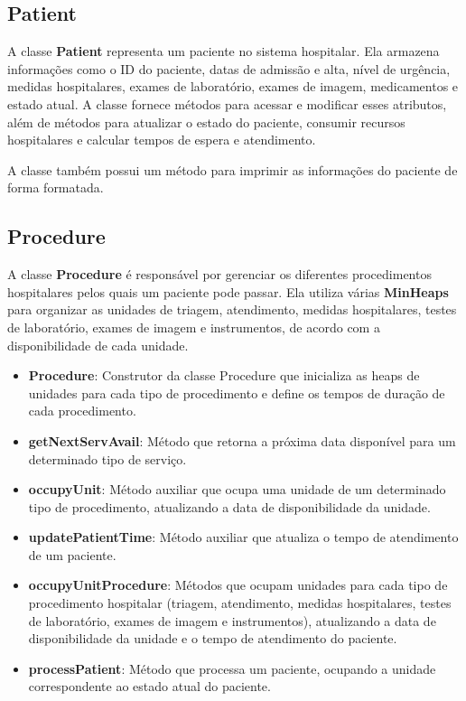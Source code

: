 \documentclass[a4paper,12pt]{article}
\begin{document}
\subsection{Patient}
A classe \textbf{Patient} representa um paciente no sistema hospitalar. Ela armazena informações como o ID do paciente, 
datas de admissão e alta, nível de urgência, medidas hospitalares, exames de laboratório, exames de imagem, medicamentos e estado atual. 
A classe fornece métodos para acessar e modificar esses atributos, além de métodos para atualizar o estado do paciente, 
consumir recursos hospitalares e calcular tempos de espera e atendimento. 

A classe também possui um método para imprimir as informações do paciente de forma formatada.

\subsection{Procedure}
A classe \textbf{Procedure} é responsável por gerenciar os diferentes procedimentos hospitalares pelos quais um paciente pode passar. 
Ela utiliza várias \textbf{MinHeaps} para organizar as unidades de triagem, atendimento, medidas hospitalares, testes de laboratório, exames de imagem e instrumentos, 
de acordo com a disponibilidade de cada unidade.

\begin{itemize}
    \item \textbf{Procedure}: Construtor da classe Procedure que inicializa as heaps de unidades para cada tipo de procedimento e define os tempos de duração de cada procedimento.
    \item \textbf{getNextServAvail}: Método que retorna a próxima data disponível para um determinado tipo de serviço.
    \item \textbf{occupyUnit}: Método auxiliar que ocupa uma unidade de um determinado tipo de procedimento, atualizando a data de disponibilidade da unidade.
    \item \textbf{updatePatientTime}: Método auxiliar que atualiza o tempo de atendimento de um paciente.
    \item \textbf{occupyUnitProcedure}: Métodos que ocupam unidades para cada tipo de procedimento hospitalar (triagem, atendimento, medidas hospitalares, testes de laboratório, exames de imagem e instrumentos), atualizando a data de disponibilidade da unidade e o tempo de atendimento do paciente.
    \item \textbf{processPatient}: Método que processa um paciente, ocupando a unidade correspondente ao estado atual do paciente.
\end{itemize}
\end{document}
